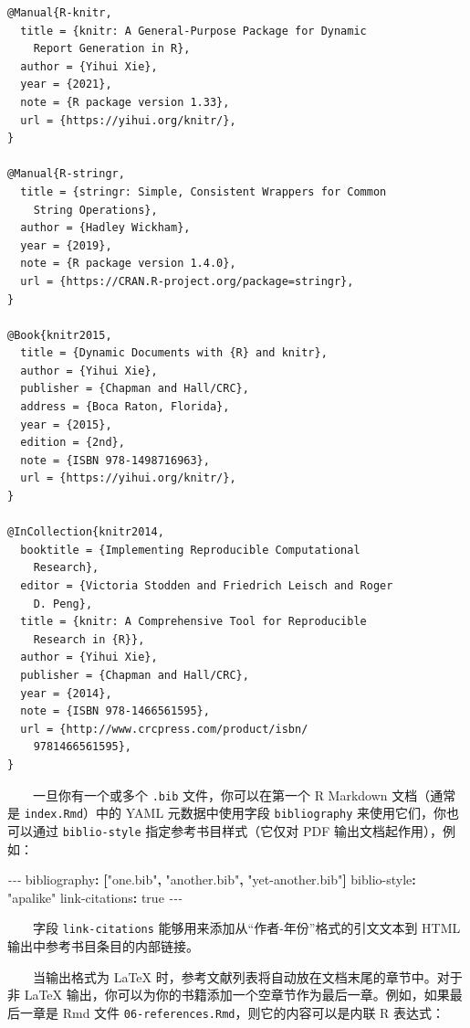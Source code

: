 \documentclass[
  12pt,
]{krantz}
\newenvironment{Shaded}{\begin{snugshade}}{\end{snugshade}}
\newcommand{\AttributeTok}[1]{\textcolor[rgb]{0.77,0.63,0.00}{#1}}
\newcommand{\CharTok}[1]{\textcolor[rgb]{0.31,0.60,0.02}{#1}}
\newcommand{\FunctionTok}[1]{\textcolor[rgb]{0.00,0.00,0.00}{#1}}
\newcommand{\KeywordTok}[1]{\textcolor[rgb]{0.13,0.29,0.53}{\textbf{#1}}}
\newcommand{\PreprocessorTok}[1]{\textcolor[rgb]{0.56,0.35,0.01}{\textit{#1}}}
\newcommand{\StringTok}[1]{\textcolor[rgb]{0.31,0.60,0.02}{#1}}
\theoremstyle{definition}
\theoremstyle{definition}
\theoremstyle{definition}
\theoremstyle{definition}
\theoremstyle{remark}
\begin{document}
\begin{verbatim}
@Manual{R-knitr,
  title = {knitr: A General-Purpose Package for Dynamic
    Report Generation in R},
  author = {Yihui Xie},
  year = {2021},
  note = {R package version 1.33},
  url = {https://yihui.org/knitr/},
}

@Manual{R-stringr,
  title = {stringr: Simple, Consistent Wrappers for Common
    String Operations},
  author = {Hadley Wickham},
  year = {2019},
  note = {R package version 1.4.0},
  url = {https://CRAN.R-project.org/package=stringr},
}

@Book{knitr2015,
  title = {Dynamic Documents with {R} and knitr},
  author = {Yihui Xie},
  publisher = {Chapman and Hall/CRC},
  address = {Boca Raton, Florida},
  year = {2015},
  edition = {2nd},
  note = {ISBN 978-1498716963},
  url = {https://yihui.org/knitr/},
}

@InCollection{knitr2014,
  booktitle = {Implementing Reproducible Computational
    Research},
  editor = {Victoria Stodden and Friedrich Leisch and Roger
    D. Peng},
  title = {knitr: A Comprehensive Tool for Reproducible
    Research in {R}},
  author = {Yihui Xie},
  publisher = {Chapman and Hall/CRC},
  year = {2014},
  note = {ISBN 978-1466561595},
  url = {http://www.crcpress.com/product/isbn/
    9781466561595},
}
\end{verbatim}

  一旦你有一个或多个 \texttt{.bib} 文件，你可以在第一个 R Markdown 文档（通常是 \texttt{index.Rmd}）中的 YAML 元数据中使用字段 \texttt{bibliography} 来使用它们，你也可以通过 \texttt{biblio-style} 指定参考书目样式（它仅对 PDF 输出文档起作用），例如：

\begin{Shaded}
\begin{Highlighting}[]
\PreprocessorTok{{-}{-}{-}}
\FunctionTok{bibliography}\KeywordTok{:}\AttributeTok{ }\KeywordTok{[}\StringTok{"one.bib"}\KeywordTok{,}\AttributeTok{ }\StringTok{"another.bib"}\KeywordTok{,}\AttributeTok{ }\StringTok{"yet{-}another.bib"}\KeywordTok{]}
\FunctionTok{biblio{-}style}\KeywordTok{:}\AttributeTok{ }\StringTok{"apalike"}
\FunctionTok{link{-}citations}\KeywordTok{:}\AttributeTok{ }\CharTok{true}
\PreprocessorTok{{-}{-}{-}}
\end{Highlighting}
\end{Shaded}

  字段 \texttt{link-citations} 能够用来添加从``作者-年份''格式的引文文本到 HTML 输出中参考书目条目的内部链接。

  当输出格式为 LaTeX 时，参考文献列表将自动放在文档末尾的章节中。对于非 LaTeX 输出，你可以为你的书籍添加一个空章节作为最后一章。例如，如果最后一章是 Rmd 文件 \texttt{06-references.Rmd}，则它的内容可以是内联 R 表达式：
\end{document}
